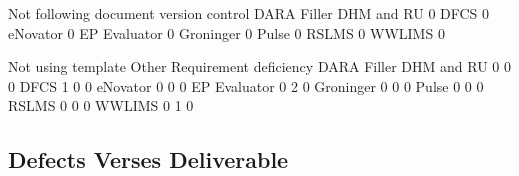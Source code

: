 \documentclass{article}
\begin{document}
\begin{Schunk}
\begin{Soutput}
                         Not following document version control
  DARA Filler DHM and RU                                      0
  DFCS                                                        0
  eNovator                                                    0
  EP Evaluator                                                0
  Groninger                                                   0
  Pulse                                                       0
  RSLMS                                                       0
  WWLIMS                                                      0
                        
                         Not using template Other Requirement deficiency
  DARA Filler DHM and RU                  0     0                      0
  DFCS                                    1     0                      0
  eNovator                                0     0                      0
  EP Evaluator                            0     2                      0
  Groninger                               0     0                      0
  Pulse                                   0     0                      0
  RSLMS                                   0     0                      0
  WWLIMS                                  0     1                      0
\end{Soutput}
\end{Schunk}

\subsection{Defects Verses Deliverable}
\end{document}
